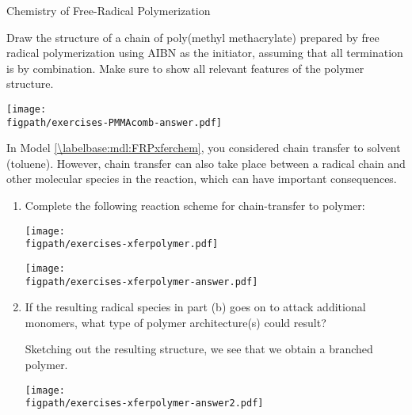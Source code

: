 \begin{activity}{Chemistry of Free-Radical Polymerization}
\begin{exercises}
	\exercise Draw the structure of a chain of poly(methyl methacrylate) prepared by free radical polymerization using AIBN as the initiator, assuming that all termination is by combination.  Make sure to show all relevant features of the polymer structure.
	
		\begin{solution}{}
				\centerline{\texttt{[image: \\figpath/exercises-PMMAcomb-answer.pdf]}}
		\end{solution}
	
	\exercise In Model \ref{\labelbase:mdl:FRPxferchem}, you considered chain transfer to solvent (toluene).  However, chain transfer can also take place between a radical chain and other molecular species in the reaction, which can have important consequences.
	
		\begin{enumerate}
			
			\item Complete the following reaction scheme for chain-transfer to polymer:
	
			\begin{solution}[1.5in]{			
				\centerline{\texttt{[image: \\figpath/exercises-xferpolymer.pdf]}}
				}	
				\centerline{\texttt{[image: \\figpath/exercises-xferpolymer-answer.pdf]}}
			\end{solution}
			
			\item If the resulting radical species in part (b) goes on to attack additional monomers, what type of polymer architecture(s) could result?
			
				\begin{solution}{}
					Sketching out the resulting structure, we see that we obtain a branched polymer.
					
									\centerline{\texttt{[image: \\figpath/exercises-xferpolymer-answer2.pdf]}}
				\end{solution}
		\end{enumerate}
		
	
\end{exercises}


%
%	


	
\end{activity}